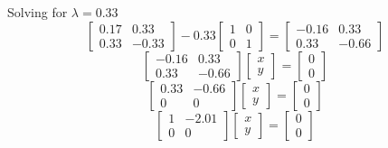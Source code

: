 \documentclass[12pt,a4paper]{paper}
\begin{document}
\begin{enumerate}
\begin{enumerate}
Solving for $\lambda = 0.33$
\begin{equation}
\left[\begin{array}{cc}0.17 & 0.33 \\ 0.33 & -0.33\end{array}\right] - 0.33 \left[\begin{array}{cc}1 & 0 \\0 & 1\end{array}\right] = \left[\begin{array}{cc}-0.16 & 0.33 \\ 0.33 & -0.66\end{array}\right]
\end{equation}
\begin{equation}
\left[\begin{array}{cc}-0.16 & 0.33 \\ 0.33 & -0.66\end{array}\right]\left[\begin{array}{c}x\\y\end{array}\right] = \left[\begin{array}{c}0\\0\end{array}\right]
\end{equation}
\begin{equation}
\left[\begin{array}{cc}0.33 & -0.66 \\ 0 & 0\end{array}\right]\left[\begin{array}{c}x\\y\end{array}\right] = \left[\begin{array}{c}0\\0\end{array}\right]
\end{equation}
\begin{equation}
\left[\begin{array}{cc} 1 & -2.01 \\ 0 & 0\end{array}\right]\left[\begin{array}{c}x\\y\end{array}\right] = \left[\begin{array}{c}0\\0\end{array}\right]
\end{equation}
\begin{equation}

\end{equation}
\end{enumerate}
\end{enumerate}
\end{document}
